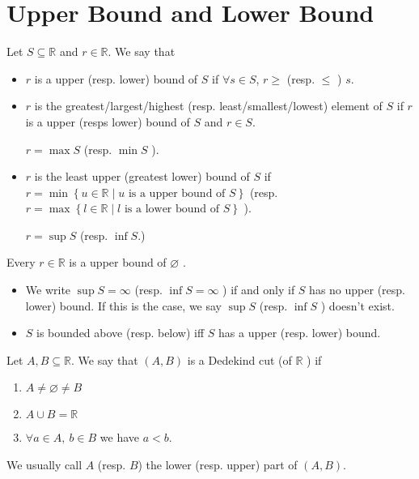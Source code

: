 \section{Upper Bound and Lower Bound}
\begin{definition}
	Let \(S \subseteq \mathbb{R} \) and \(r \in \mathbb{R} \). We say that
	\begin{itemize}
		\item \(r\) is a upper (resp. lower) bound of \(S\) if \(\forall s \in S\), \(r \ge\) (resp. \(\le\) ) \(s\). 
		\item \(r\) is the greatest/largest/highest (resp. least/smallest/lowest) element of \(S\) if \(r\) is a upper (resps lower) bound of \(S\) and \(r \in S\). 
		\begin{notation}
			\(r = \max S\) (resp. \(\min S\) ). 
		\end{notation}
		\item   \(r\) is the least upper (greatest lower) bound of \(S\) if \(r = \min \left\{ u \in \mathbb{R} \mid u \text{ is a upper bound of } S \right\} \) (resp. \(r = \max \left\{ l \in \mathbb{R} \mid l \text{ is a lower bound of } S \right\} \) ).
		\begin{notation}
			\(r = \sup S\) (resp. \(\inf S\).) 
		\end{notation}          
	\end{itemize}  
\end{definition}

\begin{remark}
	Every \(r \in \mathbb{R} \) is a upper bound of \(\varnothing \) .
\end{remark}

\begin{note}
\begin{itemize}
	\item 	We write \(\sup S = \infty \) (resp. \(\inf S = \infty \) ) if and only if \(S\) has no upper (resp. lower) bound. If this is the case, we say \(\sup S\) (resp. \(\inf S\) ) doesn't exist.  
	\item \(S\) is bounded above (resp. below) iff \(S\) has a upper (resp. lower) bound.  
\end{itemize}  
\end{note}

\begin{definition}
	Let \(A, B \subseteq \mathbb{R} \). We say that \((A,B)\) is a Dedekind cut (of \(\mathbb{R} \) ) if 
	\begin{enumerate}
		\item \(A \neq \varnothing \neq B\) 
		\item \(A \cup  B = \mathbb{R} \)
		\item \(\forall a \in A, \ b \in B\) we have \(a < b\).
	\end{enumerate}   
	We usually call \(A\) (resp. \(B\)) the lower (resp. upper) part of \((A,B)\).    
\end{definition}

